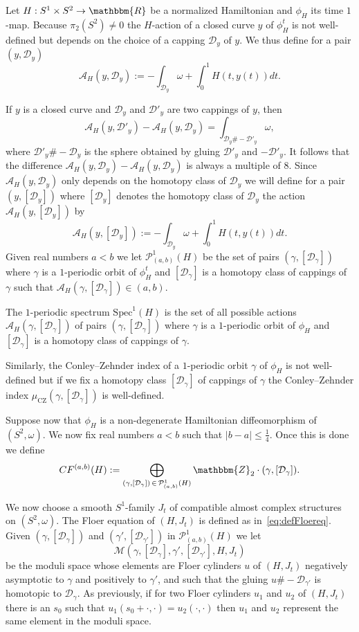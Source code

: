 \documentclass[AHL,Unicode,longabstracts,published]{cedram}
\newcommand{\Z}{\mathbbm{Z}}
\newcommand{\R}{\mathbbm{R}}
\newcommand{\Spec}{\mathrm{Spec}}
\newcommand{\rCZ}{\mathrm{CZ}}
\newcommand{\clP}{\mathcal{P}}
\newcommand{\clA}{\mathcal{A}}
\newcommand{\clM}{\mathcal{M}}
\newcommand{\clD}{\mathcal{D}}
\begin{document}
Let $H: S^1 \times S^2 \to \R$ be a normalized Hamiltonian and $\phi_H$ its time $1$-map. Because $\pi_2(S^2) \neq 0$ the $H$-action of a closed curve $y$ of $\phi^t_H$ is not well-defined but depends on the choice of a capping $\clD_y$ of $y$. We thus define for a pair $(y,\clD_y)$
\begin{equation}
\clA_H(y,\clD_y) := -\int_{\clD_y} \omega + \int_0^1 H(t,y(t))dt.
\end{equation}

If $y$ is a closed curve and $\clD_y$ and $\clD'_y$ are two cappings of $y$, then
\[
\clA_H(y,\clD'_y) - \clA_H(y,\clD_y)= \int_{\clD_y \# -\clD'_y} \omega,
\]
where $\clD'_y \# -\clD_y$ is the sphere obtained by gluing $\clD'_y$ and $-\clD'_y$. It follows that the difference $\clA_H(y,\clD_y) - \clA_H(y,\clD_y)$ is always a multiple of $8$. Since $\clA_H(y,\clD_y)$ only depends on the homotopy class of $\clD_y$ we will define for a pair $(y,[\clD_y])$ where $[\clD_y]$ denotes the homotopy class of $\clD_y$ the action $\clA_H(y,[\clD_y]) $ by
\begin{equation}\label{eq:actionS2}
\clA_H(y,[\clD_y]) := -\int_{\clD_y} \omega + \int_0^1 H(t,y(t))dt.
\end{equation}
Given real numbers $a<b$ we let $\clP^1_{(a,b)}(H)$ be the set of pairs $(\gamma,[\clD_\gamma])$ where $\gamma$ is a $1$-periodic orbit of $\phi^t_H$ and $[\clD_\gamma]$ is a homotopy class of cappings of $\gamma$ such that $\clA_H(\gamma,[\clD_\gamma])\in (a,b) $.

The $1$-periodic spectrum $\Spec^1(H)$ is the set of all possible actions $\clA_H(\gamma,[\clD_\gamma])$ of pairs $(\gamma,[\clD_\gamma])$ where $\gamma$ is a $1$-periodic orbit of $\phi_H$ and $[\clD_\gamma]$ is a homotopy class of cappings of $\gamma$.

Similarly, the Conley--Zehnder index of a $1$-periodic orbit $\gamma$ of $\phi_H$ is not well-defined but if we fix a homotopy class $[\clD_\gamma]$ of cappings of $\gamma$ the Conley--Zehnder index $\mu_{\rCZ}(\gamma, [\clD_\gamma])$ is well-defined.

Suppose now that $\phi_H$ is a non-degenerate Hamiltonian diffeomorphism of $(S^2,\omega)$.
We now fix real numbers $a<b$ such that $|b-a| \leq \frac{1}{4}$. Once this is done we define
\[
CF^{(a,b)}(H):= \bigoplus_{(\gamma, [\clD_\gamma]) \,\in\,\clP^1_{(a,b)}(H)}\Z_2 \cdot (\gamma, [\clD_\gamma]).
\]

We now choose a smooth $S^1$-family $J_t$ of compatible almost complex structures on $(S^2,\omega)$. The Floer equation of $(H,J_t)$ is defined as in~\eqref{eq:defFloereq}. Given $(\gamma, [\clD_\gamma])$ and $(\gamma', [\clD_{\gamma'}])$ in $\clP^1_{(a,b)}(H)$ we let
\[
\clM(\gamma, [\clD_\gamma],\gamma', [\clD_{\gamma'}],H,J_t)
\]
be the moduli space whose elements are Floer cylinders $u$ of $(H,J_t)$ negatively asymptotic to $\gamma$ and positively to $\gamma'$, and such that the gluing $u \# - \clD_{\gamma'}$ is homotopic to $\clD_\gamma$. As previously, if for two Floer cylinders $u_1$ and $u_2$ of $(H,J_t)$ there is an $s_0$ such that $u_1(s_0 + \cdot,\cdot)=u_2(\cdot,\cdot)$ then $u_1$ and $u_2$ represent the same element in the moduli space.
\end{document}

